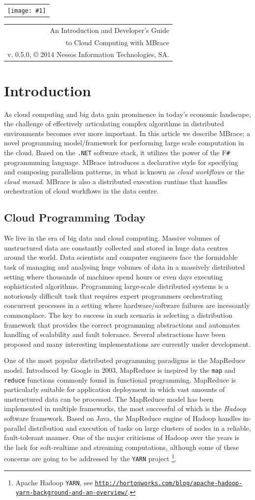 \documentclass[9pt,a4paper]{article}
\makeatletter
\newcommand{\version}{0.5.0}
\newcommand{\showheader}[1]{%
%
\begin{center}
\begin{tabular}{@{} l}
\texttt{[image: \#1]}
\end{tabular}%
%
\hspace{3em}
%
\begin{tabular}{ @{\hspace{\stretch{5}}} r }
{\huge An Introduction and Developer's Guide}\\[1.2em]
{\huge to Cloud Computing with \TitularMbrace}\\[3em]
{{v\mbox{.} \version},\hspace{1em}%
\copyright{} 2014 Nessos Information Technologies, SA.}
\end{tabular}%
\end{center}%
}
\newcommand{\mbrace}{MBrace}
\newcommand{\Mbrace}{MBrace}
\newcommand{\TitularMbrace}{MBrace}
\newcommand{\fsharp}{F\texttt \#}
\newcommand{\dotnet}{\texttt{\hbox{.}NET}}
\newcommand{\samehref}[1]{\href{#1}{\texttt{#1}}}
\makeatother
\begin{document}
%
%
\showheader{mbrace.png}
%
%
\section{Introduction}%
%
As cloud computing and big data gain prominence in today's economic landscape,
the challenge of effectively articulating complex algorithms in distributed environments
becomes ever more important.
%
In this article we describe \mbrace; a novel programming model/framework for performing
large scale computation in the cloud. Based on the \dotnet{} software stack, it utilizes
the power of the \fsharp{} programmming language.
\Mbrace{} introduces a declarative style for specifying and composing parallelism patterns,
in what is known as \emph{cloud workflows} or the \emph{cloud monad}.
\Mbrace{} is also a distributed execution runtime that handles orchestration of cloud 
workflows in the data centre.
%
\subsection{Cloud Programming Today}
%
We live in the era of big data and cloud computing. Massive volumes of unstructured 
data are constantly collected and stored in huge data centres around the world. 
Data scientists and computer engineers face the formidable task of managing and 
analysing huge volumes of data in a massively distributed setting where thousands of 
machines spend  hours or even days executing sophisticated algorithms.
Programming large-scale distributed systems is a notoriously difficult task
that requires expert programmers orchestrating concurrent processes in a setting
where hardware/\mbox{}software failures are incessantly commonplace.
The key to success in such scenaria is selecting a distribution framework that provides the
correct programming abstractions and automates handling of scalability and fault tolerance.
Several abstractions have been proposed and many interesting implementations are
currently under development.

One of the most popular distributed programming paradigms is the
MapReduce model. Introduced by Google\cite{map-reduce} in 2003, MapReduce is inspired by the \texttt{map}
and \texttt{reduce} functions commonly found in functional programming. MapReduce is
particularly suitable for application deployment in which vast amounts of unstructured
data can be processed. The MapReduce model has been implemented in multiple frameworks,
the most successful of which is the \emph{Hadoop} software framework.
Based on Java, the MapReduce engine of Hadoop handles in-parallel 
distribution and execution of tasks on large clusters of nodes in a reliable, 
fault-tolerant manner.  One of the major criticisms of Hadoop over the years is the 
lack for soft-realtime and streaming computations, although some of these concerns are 
going to be addressed by the \texttt{YARN} project%
\footnote{Apache Hadoop \texttt{YARN},
see \samehref{http://hortonworks.com/blog/apache-hadoop-yarn-background-and-an-overview/}.}. 
\end{document}
